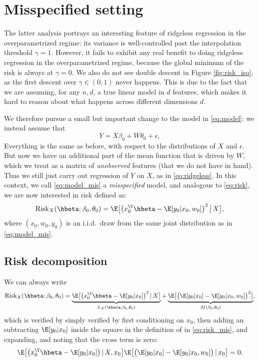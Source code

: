 \documentclass{article}
\begin{document}
\section{Misspecified setting}

The latter analysis portrays an interesting feature of ridgeless regression in  
the overparametrized regime: its variance is well-controlled past the
interpolation threshold $\gamma = 1$. However, it fails to exhibit any real
benefit to doing ridgeless regression in the overparametrized regime, because
the global minimum of the risk is always at $\gamma = 0$. We also do not see
double descent in Figure \ref{fig:risk_iso}, as the first descent over $\gamma
\in (0,1)$ never happens. This is due to the fact that we are assuming, for any 
$n,d$, a true linear model in $d$ features, which makes it hard to reason about
what happens across different dimensions $d$.    

We therefore pursue a small but important change to the model in
\eqref{eq:model}: we instead assume that    
\begin{equation}
\label{eq:model_mis}
Y = X\beta_0 + W\theta_0 + \epsilon,
\end{equation}
Everything is the same as before, with respect to the distributions of $X$ and
$\epsilon$. But now we have an additional part of the mean function that is
driven by $W$, which we treat as a matrix of \emph{unobserved} features (that we 
do not have in hand). Thus we still just carry out regression of $Y$ on $X$, as
in \eqref{eq:ridgeless}. In this context, we call \eqref{eq:model_mis} a
\emph{misspecified} model, and analogous to \eqref{eq:risk}, we are now 
interested in risk defined as:
\begin{equation}
\label{eq:risk_mis}
\Risk_X(\hbeta; \beta_0, \theta_0) = \E \big[ \big( x_0^\T \hbeta -
\E[y_0|x_0,w_0] \big)^2 \,\big|\, X \big],
\end{equation}
where $(x_0,w_0,y_0)$ is an i.i.d.\ draw from the same joint distribution as in 
\eqref{eq:model_mis}. 

\subsection{Risk decomposition} 

We can always write 
\begin{equation}
\label{eq:risk_mis_decomp}
\Risk_X(\hbeta; \beta_0, \theta_0) = 
\underbrace{\E \big[ \big( x_0^\T \hbeta - \E[y_0|x_0] \big)^2 \,|\, X 
  \big]}_{L_X(\hbeta; \beta_0, \theta_0)} +
\underbrace{\E \big[ \big( \E[y_0|x_0] - \E[y_0|x_0,w_0] \big)^2
  \big]}_{M(\beta_0, \theta_0)}, 
\end{equation}
which is verified by simply verified by first conditioning on $x_0$, then adding
an subtracting $\E[y_0|x_0]$ inside the square in the definition of
 in \eqref{eq:risk_mis}, and expanding, 
and noting that the cross term is zero:   
\[
\E \big[ \big( x_0^\T \hbeta - \E[y_0|x_0] \big) \,|\, X,x_0 \big]
\E \big[\big( \E[y_0|x_0] - \E[y_0|x_0,w_0] \big) \,|\, x_0 \big] = 0.
\]
\end{document}
